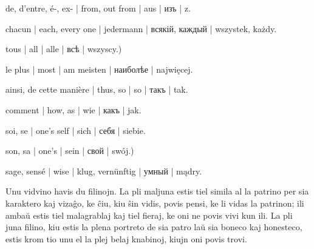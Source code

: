 \begin{ekzvocab}{1em}
 de, d’entre, é-, ex- | from, out from | aus | изъ | z.

 chacun | each, every one | jedermann | всякій, каждый | wszystek, każdy.

 tous | all | alle | всѣ | wszyscy.)

 le plus | most | am meisten | наиболѣе | najwięcej.

 ainsi, de cette manière | thus, so | so | такъ | tak.

 comment | how, as | wie | какъ | jak.

 soi, se | one’s self | sich | себя | siebie.

 son, sa | one’s | sein | свой | swój.)

 sage, sensé | wise | klug, vernünftig | умный | mądry.

\end{ekzvocab}

\begin{samepage}

Unu vidvino havis du filinojn. La pli maljuna estis tiel simila al la patrino per sia karaktero kaj vizaĝo, ke ĉiu, kiu ŝin vidis, povis pensi, ke li vidas la patrinon; ili ambaŭ estis tiel malagrablaj kaj tiel fieraj, ke oni ne povis vivi kun ili. La pli juna filino, kiu estis la plena portreto de sia patro laŭ sia boneco kaj honesteco, estis krom tio unu el la plej belaj knabinoj, kiujn oni povis trovi.
\end{samepage}

